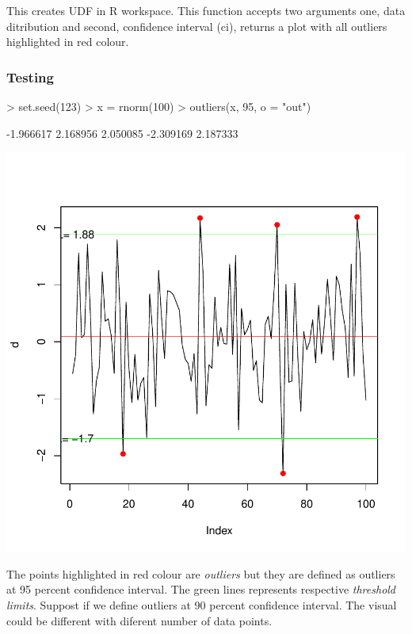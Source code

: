 \documentclass{article}
\begin{document}
This creates UDF in R workspace. This function accepts two arguments one, data ditribution and second, confidence interval (ci), returns a plot with all outliers highlighted in red colour. 

\subsubsection{Testing}


\begin{Schunk}
\begin{Sinput}
> set.seed(123)
> x = rnorm(100)
> outliers(x, 95, o = "out")
\end{Sinput}
\begin{Soutput}
[1] -1.966617  2.168956  2.050085 -2.309169  2.187333
\end{Soutput}
\end{Schunk}
\includegraphics{outliers-003}

The points highlighted in red colour are \emph{outliers} but they are defined as outliers at 95 percent confidence interval. The green lines represents respective \emph{threshold limits}. Suppost if we define outliers at 90 percent confidence interval. The visual could be different with diferent number of data points. 
\end{document}
